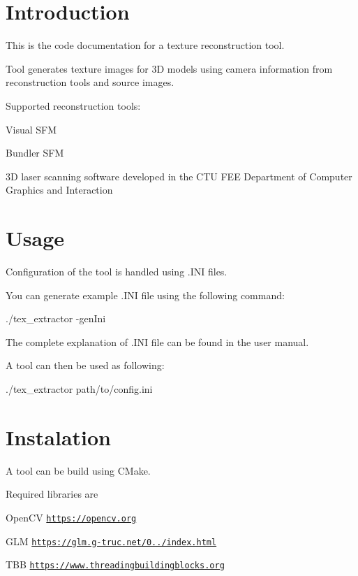 \hypertarget{index_intro_sec}{}\section{Introduction}\label{index_intro_sec}
This is the code documentation for a texture reconstruction tool.

Tool generates texture images for 3\+D models using camera information from reconstruction tools and source images.

Supported reconstruction tools\+:
\begin{DoxyItemize}
\item Visual S\+F\+M
\item Bundler S\+F\+M
\item 3\+D laser scanning software developed in the C\+T\+U F\+E\+E Department of Computer Graphics and Interaction
\end{DoxyItemize}\hypertarget{index_sec_u}{}\section{Usage}\label{index_sec_u}
Configuration of the tool is handled using .I\+N\+I files.

You can generate example .I\+N\+I file using the following command\+: 
\begin{DoxyCode}
./tex\_extractor -genIni
\end{DoxyCode}
 The complete explanation of .I\+N\+I file can be found in the user manual.

A tool can then be used as following\+: 
\begin{DoxyCode}
./tex\_extractor path/to/config.ini
\end{DoxyCode}
\hypertarget{index_sec_i}{}\section{Instalation}\label{index_sec_i}
A tool can be build using C\+Make.

Required libraries are
\begin{DoxyItemize}
\item Open\+C\+V \href{https://opencv.org}{\tt https\+://opencv.\+org}
\item G\+L\+M \href{https://glm.g-truc.net/0.9.8/index.html}{\tt https\+://glm.\+g-\/truc.\+net/0../index.\+html}
\item T\+B\+B \href{https://www.threadingbuildingblocks.org}{\tt https\+://www.\+threadingbuildingblocks.\+org} 
\end{DoxyItemize}